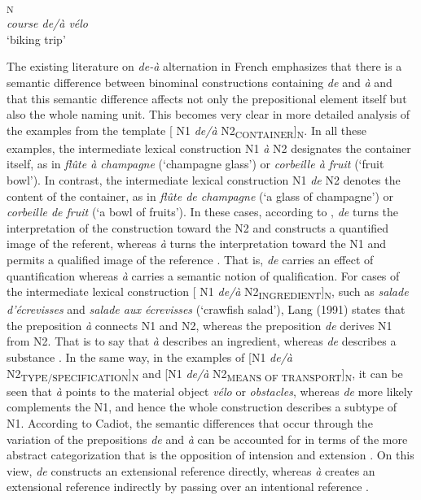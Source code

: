 \documentclass[output=paper]{langsci/langscibook}
\begin{document}
\ea{}\textsubscript{N}\\
\textit{course de/à vélo}\\
`biking trip'
\z

The existing literature on \textit{de-à} alternation in French emphasizes that there is a semantic difference between binominal constructions containing \textit{de} and \textit{à} and that this semantic difference affects not only the prepositional element itself but also the whole naming unit. This becomes very clear in more detailed analysis of the examples from the template [ N1 \textit{de/à} N2\textsubscript{CONTAINER}]\textsubscript{N}. In all these examples, the intermediate lexical construction N1 \textit{à} N2 designates the container itself, as in \textit{flûte à champagne} (`champagne glass') or \textit{corbeille à fruit} (`fruit bowl'). In contrast, the intermediate lexical construction N1 \textit{de} N2 denotes the content of the container, as in \textit{flûte de champagne} (`a glass of champagne') or \textit{corbeille de fruit} (`a bowl of fruits'). In these cases, according to \citet{Cadiot:1997}, \textit{de} turns the interpretation of the construction toward the N2 and constructs a quantified image of the referent, whereas \textit{à} turns the interpretation toward the N1 and permits a qualified image of the reference \citep[44]{Cadiot:1997}. That is, \textit{de} carries an effect of quantification whereas \textit{à} carries a semantic notion of qualification. For cases of the intermediate lexical construction [ N1 \textit{de/à} N2\textsubscript{INGREDIENT}]\textsubscript{N}, such as \textit{salade d’écrevisses} and \textit{salade aux écrevisses} (`crawfish salad'), Lang (1991) states that the preposition \textit{à} connects N1 and N2, whereas the preposition \textit{de} derives N1 from N2. That is to say that \textit{à} describes an ingredient, whereas \textit{de} describes a substance \citep[283]{Lang:1991}. In the same way, in the examples of [N1 \textit{de/à} N2\textsubscript{TYPE/SPECIFICATION}]\textsubscript{N} and [N1 \textit{de/à} N2\textsubscript{MEANS OF TRANSPORT}]\textsubscript{N}, it can be seen that \textit{à} points to the material object \textit{vélo} or \textit{obstacles}, whereas  \textit{de} more likely complements the N1, and hence the whole construction describes a subtype of N1. According to Cadiot, the semantic differences that occur through the variation of the prepositions \textit{de} and \textit{à} can be accounted for in terms of the more abstract categorization that is the opposition of intension and extension \citep[43]{Cadiot:1997}. On this view, \textit{de} constructs an extensional reference  directly, whereas \textit{à} creates an extensional reference  indirectly by passing over an intentional reference \citep[62]{Cadiot:1997}. 
\end{document}
